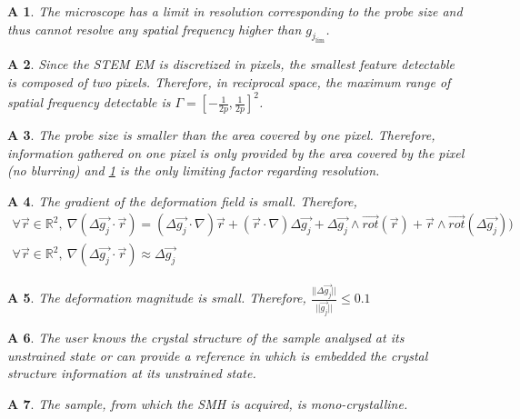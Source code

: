\documentclass[12pt]{article}
\newtheorem{A}{A}
\begin{document}
\begin{A}
\normalfont The microscope has a limit in resolution corresponding to the probe size and thus cannot resolve any spatial frequency higher than $g_{j_{\text{lim}}}$. 
\label{A_1}
\end{A}
\begin{A}
\normalfont Since the STEM EM is discretized in pixels, the smallest feature detectable is composed of two pixels. Therefore, in reciprocal space, the maximum range of spatial frequency detectable is $\Gamma=[-\frac{1}{2p},\frac{1}{2p}]^{2}$.
\label{A_2}
\end{A}
\begin{A}
\normalfont The probe size is smaller than the area covered by one pixel. Therefore, information gathered on one pixel is only provided by the area covered by the pixel (no blurring) and \cref{A_1} is the only limiting factor regarding resolution.
\label{A_3}
\end{A}
\begin{A}
\label{A_4}
\normalfont The gradient of the deformation field is small. Therefore,
\begin{equation*}
\begin{gathered}
\forall \vec{r} \in \mathbb{R}^2, \ \nabla (\Delta\overrightarrow{g_j}\cdot\vec{r})= (\Delta\overrightarrow{g_j}\cdot\nabla)\vec{r}+(\vec{r}\cdot\nabla)\Delta\overrightarrow{g_j}+\Delta\overrightarrow{g_j}\wedge \overrightarrow{\mathit{rot}}(\vec{r})+\vec{r}\wedge \overrightarrow{\mathit{rot}}(\Delta\overrightarrow{g_j}))\\
\forall \vec{r} \in \mathbb{R}^2, \ \nabla (\Delta\overrightarrow{g_j}\cdot\vec{r})\approx \Delta\overrightarrow{g_j}
\end{gathered}
\end{equation*}
\end{A}
\begin{A}
\label{A_5}
\normalfont The deformation magnitude is small. Therefore, $\frac{||\Delta\overrightarrow{g_j} ||}{||\overrightarrow{g_j} ||}\leq 0.1$
\end{A}
\begin{A}
\label{A_6}
\normalfont The user knows the crystal structure of the sample analysed at its unstrained state or can provide a reference in which is embedded the crystal structure information at its unstrained state.
\end{A}
\begin{A}
\label{A_7}
\normalfont The sample, from which the SMH is acquired, is mono-crystalline.
\end{A}
\end{document}
